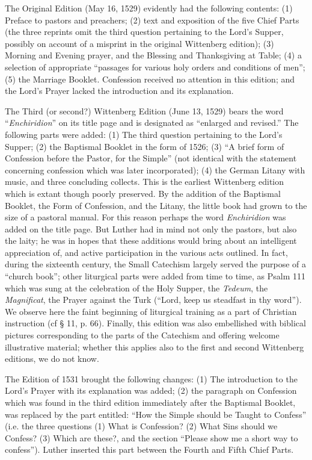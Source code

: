 The Original Edition (May 16, 1529) evidently had the following contents: (1) Preface to pastors and preachers; (2) text and exposition of the five Chief Parts (the three reprints omit the third question pertaining to the Lord’s Supper, possibly on account of a misprint in the original Wittenberg edition); (3) Morning and Evening prayer, and the Blessing and Thanksgiving at Table; (4) a selection of appropriate “passages for various holy orders and conditions of men”; (5) the Marriage Booklet. Confession received no attention in this edition; and the Lord’s Prayer lacked the introduction and its explanation.

The Third (or second?) Wittenberg Edition (June 13, 1529) bears the word “\emph{Enchiridion}” on its title page and is designated as “enlarged and revised.” The following parts were added: (1) The third question pertaining to the Lord’s Supper; (2) the Baptismal Booklet in the form of 1526; (3) “A brief form of Confession before the Pastor, for the Simple” (not identical with the statement concerning confession which was later incorporated); (4) the German Litany with music, and three concluding collects. This is the earliest Wittenberg edition which is extant though poorly preserved. By the addition of the Baptismal Booklet, the Form of Confession, and the Litany, the little book had grown to the size of a pastoral manual. For this reason perhaps the word \emph{Enchiridion} was added on the title page. But Luther had in mind not only the pastors, but also the laity; he was in hopes that these additions would bring about an intelligent appreciation of, and active participation in the various acts outlined. In fact, during the sixteenth century, the Small Catechism largely served the purpose of a “church book”; other liturgical
parts were added from time to time, as Psalm 111 which was sung at the celebration of the Holy Supper, the \emph{Tedeum}, the \emph{Magnificat}, the Prayer against the Turk (“Lord, keep us steadfast in thy word”). We observe here the faint beginning of liturgical training as a part of Christian instruction (cf § 11, p. 66). Finally, this edition was also embellished with biblical pictures corresponding to the parts of the Catechism and offering welcome illustrative material; whether this applies also to the first and second Wittenberg editions, we do not know.

The Edition of 1531 brought the following changes: (1) The introduction to the Lord’s Prayer with its explanation was added; (2) the paragraph on Confession which was found in the third edition immediately after the Baptismal Booklet, was replaced by the part entitled: “How the Simple should be Taught to Confess” (i.e. the three questions (1) What is Confession? (2) What Sins should we Confess? (3) Which are these?, and the section “Please show me a short way to confess”). Luther inserted this part between the Fourth and Fifth Chief Parts.

